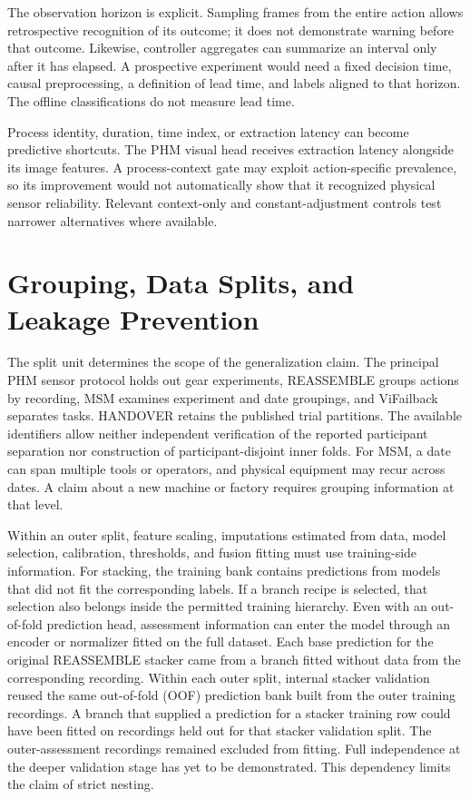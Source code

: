 The observation horizon is explicit. Sampling frames from the entire action allows retrospective recognition of its outcome; it does not demonstrate warning before that outcome. Likewise, controller aggregates can summarize an interval only after it has elapsed. A prospective experiment would need a fixed decision time, causal preprocessing, a definition of lead time, and labels aligned to that horizon. The offline classifications do not measure lead time.

Process identity, duration, time index, or extraction latency can become predictive shortcuts. The PHM visual head receives extraction latency alongside its image features. A process-context gate may exploit action-specific prevalence, so its improvement would not automatically show that it recognized physical sensor reliability. Relevant context-only and constant-adjustment controls test narrower alternatives where available.

\section{Grouping, Data Splits, and Leakage Prevention}
The split unit determines the scope of the generalization claim. The principal PHM sensor protocol holds out gear experiments, REASSEMBLE groups actions by recording, MSM examines experiment and date groupings, and ViFailback separates tasks. HANDOVER retains the published trial partitions. The available identifiers allow neither independent verification of the reported participant separation nor construction of participant-disjoint inner folds. For MSM, a date can span multiple tools or operators, and physical equipment may recur across dates. A claim about a new machine or factory requires grouping information at that level.

Within an outer split, feature scaling, imputations estimated from data, model selection, calibration, thresholds, and fusion fitting must use training-side information. For stacking, the training bank contains predictions from models that did not fit the corresponding labels. If a branch recipe is selected, that selection also belongs inside the permitted training hierarchy. Even with an out-of-fold prediction head, assessment information can enter the model through an encoder or normalizer fitted on the full dataset. Each base prediction for the original REASSEMBLE stacker came from a branch fitted without data from the corresponding recording. Within each outer split, internal stacker validation reused the same out-of-fold (OOF) prediction bank built from the outer training recordings. A branch that supplied a prediction for a stacker training row could have been fitted on recordings held out for that stacker validation split. The outer-assessment recordings remained excluded from fitting. Full independence at the deeper validation stage has yet to be demonstrated. This dependency limits the claim of strict nesting.

